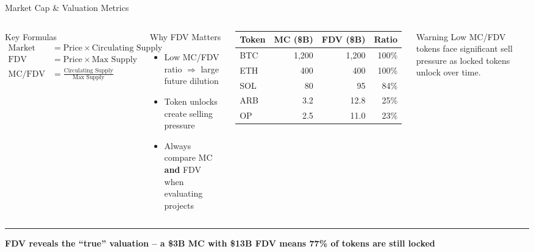 \documentclass[8pt,aspectratio=169]{beamer}
\newcommand{\bottomnote}[1]{\vfill\vspace{-2mm}\textcolor{mllavender2}{\rule{\textwidth}{0.4pt}}\vspace{1mm}\footnotesize\textbf{#1}}
\begin{document}
\begin{frame}{Market Cap \& Valuation Metrics}
\begin{columns}[T]
\begin{block}{Key Formulas}
\footnotesize
\begin{align}
\text{Market Cap} &= \text{Price} \times \text{Circulating Supply} \\
\text{FDV} &= \text{Price} \times \text{Max Supply} \\
\text{MC/FDV Ratio} &= \frac{\text{Circulating Supply}}{\text{Max Supply}}
\end{align}
\end{block}
\vspace{2mm}
\begin{block}{Why FDV Matters}
\footnotesize
\begin{itemize}
  \item Low MC/FDV ratio $\Rightarrow$ large future dilution
  \item Token unlocks create selling pressure
  \item Always compare MC \textbf{and} FDV when evaluating projects
\end{itemize}
\end{block}

\footnotesize
\begin{tabular}{lrrr}
\toprule
\textbf{Token} & \textbf{MC (\$B)} & \textbf{FDV (\$B)} & \textbf{Ratio} \\
\midrule
BTC & 1,200 & 1,200 & 100\% \\
ETH & 400 & 400 & 100\% \\
SOL & 80 & 95 & 84\% \\
ARB & 3.2 & 12.8 & 25\% \\
OP & 2.5 & 11.0 & 23\% \\
\bottomrule
\end{tabular}
\vspace{2mm}
\begin{alertblock}{\footnotesize Warning}
\footnotesize
Low MC/FDV tokens face significant sell pressure as locked tokens unlock over time.
\end{alertblock}
\end{columns}
\bottomnote{FDV reveals the ``true'' valuation -- a \$3B MC with \$13B FDV means 77\% of tokens are still locked}
\end{frame}
\end{document}
